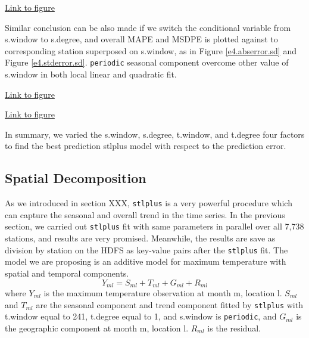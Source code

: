 \begin{framed}
\begin{center}
  \href{../plots/a1950/E4/tmax.mean.std.error.sw.pdf}{Link to figure}
  \label{e4.stderror.sw}
\end{center}
\end{framed}

Similar conclusion can be also made if we switch the conditional variable from
s.window to s.degree, and overall MAPE and MSDPE is plotted against to 
corresponding station superposed on s.window, as in Figure 
\href{../plots/a1950/E4/tmax.mean.std.error.sw.pdf}{\ref*{e4.abserror.sd}} and 
Figure \href{../plots/a1950/E4/tmax.mean.std.error.sd.pdf}{\ref*{e4.stderror.sd}}.
\texttt{periodic} seasonal component overcome other value of s.window in both
local linear and quadratic fit.


\begin{framed}
\begin{center}
  \href{../plots/a1950/E4/tmax.mean.absmeans.error.sd.pdf}{Link to figure}
  \label{e4.abserror.sd}
\end{center}
\end{framed}

\begin{framed}
\begin{center}
  \href{../plots/a1950/E4/tmax.mean.std.error.sd.pdf}{Link to figure}
  \label{e4.stderror.sd}
\end{center}
\end{framed}

In summary, we varied the s.window, s.degree, t.window, and t.degree four factors
to find the best prediction stlplus model with respect to the prediction error.

\subsection{Spatial Decomposition}
\label{sec:a1950.spafit}

As we introduced in section XXX, \texttt{stlplus} is a very powerful procedure
which can capture the seasonal and overall trend in the time series. In the 
previous section, we carried out \texttt{stlplus} fit with same parameters in
parallel over all 7,738 stations, and results are very promised. Meanwhile, the
results are save as division by station on the HDFS as key-value pairs after
the \texttt{stlplus} fit. The model we are proposing is an additive model for 
maximum temperature with spatial and temporal components. 
$$
Y_{ml} = S_{ml} + T_{ml} + G_{ml} + R_{ml}
$$
where $Y_{ml}$ is the maximum temperature observation at month m, location l. 
$S_{ml}$ and $T_{ml}$ are the seasonal component and trend component fitted by
\texttt{stlplus} with t.window equal to 241, t.degree equal to 1, and s.window
is \texttt{periodic}, and $G_{ml}$ is the geographic component at month m, 
location l. $R_{ml}$ is the residual. 

